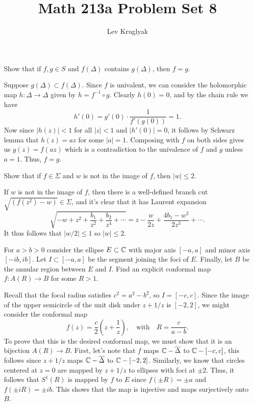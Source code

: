 \documentclass{pset}
\title{Math 213a Problem Set 8}
\author{Lev Kruglyak}
\begin{document}
\maketitle
\collaborators

\begin{problem}{3}
  Show that if $f,g\in S$ and $f(\Delta)$ contains $g(\Delta)$, then $f=g$.
\end{problem}

\begin{solution}
  Suppose $g(\Delta)\subset f(\Delta)$. Since $f$ is univalent, we can consider the holomorphic map $h : \Delta \to \Delta$ given by $h = f^{-1}\circ g$. Clearly $h(0)=0$, and by the chain rule we have
  \[
    h'(0) = g'(0)\cdot \frac{1}{f'(g(0))} = 1.
  \]
  Now since $|h(z)|< 1$ for all $|z|<1$ and $|h'(0)|=0$, it follows by Schwarz lemma that $h(z)=az$ for some $|a|=1$. Composing with $f$ on both sides gives us $g(z)=f(az)$ which is a contradiction to the univalence of $f$ and $g$ unless $a=1$. Thus, $f=g$.
\end{solution}

\begin{problem}{5}
  Show that if $f\in \Sigma$ and $w$ is not in the image of $f$, then $|w|\leq 2$.
\end{problem}

\begin{solution}
  If $w$ is not in the image of $f$, then there is a well-defined branch cut $\sqrt{(f(z^2)-w)}\in \Sigma$, and it's clear that it has Laurent expansion 
  \[
    \sqrt{-w+z^2+\frac{b_1}{z^2}+\frac{b_2}{z^4}+\cdots} = z - \frac{w}{2z} + \frac{4b_1-w^2}{2z^3}+\cdots.
  \]
  It thus follows that $|w/2|\leq 1$ so $|w|\leq 2$.
\end{solution}

\begin{problem}{8}
  For $a > b > 0$ consider the ellipse $E\subset \mathbb{C}$ with major axis $[-a,a]$ and minor axis $[-ib, ib]$. Let $I\subset [-a, a]$ be the segment joining the foci of $E$. Finally, let $B$ be the annular region between $E$ and $I$. Find an explicit conformal map $f : A(R) \to B$ for some $R>1$.
\end{problem}

\begin{solution}
  Recall that the focal radius satisfies $c^2=a^2-b^2$, so $I=[-c, c]$. Since the image of the upper semicircle of the unit disk under $z+1/z$ is $[-2,2]$, we might consider the conformal map
  \[
    f(z) = \frac{c}{2}\left(z+\frac{1}{z}\right),\quad\textrm{with}\quad R = \frac{c}{a-b}.
  \]
  To prove that this is the desired conformal map, we must show that it is an bijection $A(R) \to B$. First, let's note that $f$ maps $\mathbb{C} - \overline{\Delta}$ to $\mathbb{C} - [-c, c]$, this follows since $z+1/z$ maps $\mathbb{C} - \overline{\Delta}$ to $\mathbb{C} - [-2,2]$. Similarly, we know that circles centered at $z=0$ are mapped by $z+1/z$ to ellipses with foci at $\pm 2$. Thus, it follows that $S^1(R)$ is mapped by $f$ to $E$ since $f(\pm R) = \pm a$ and $f(\pm iR) = \pm ib$. This shows that the map is injective and maps surjectively onto $B$.
\end{solution}
\end{document}
